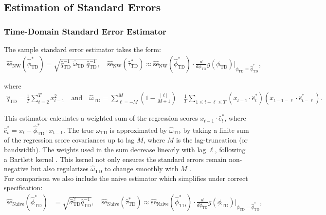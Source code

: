 \documentclass[9pt]{article}
\newcommand{\phitd}{\phi_{\scriptscriptstyle\text{TD}}}
\newcommand{\hatphitd}{\hat{\phi}^*_{\scriptscriptstyle\text{TD}}}
\newcommand{\hattautd}{\hat{\tau}^*_{\scriptscriptstyle\text{TD}}}
\newcommand{\hatqtd}{\hat{q}_{\scriptscriptstyle\text{TD}}}
\newcommand{\omegatd}{\omega_{\scriptscriptstyle\text{TD}}}
\newcommand{\hatomegatd}{\hat{\omega}_{\scriptscriptstyle\text{TD}}}
\newcommand{\hatsigmatd}{\hat{\sigma}_{\scriptscriptstyle\text{TD}}}
\begin{document}
\subsection{Estimation of Standard Errors}\label{sec:stderr_}
\subsubsection{Time-Domain Standard Error Estimator}\label{sec:stderr-time-domain_}
The sample standard error estimator takes the form:
\begin{align}\label{eq:stderr-time-domain_}
\widehat{\text{se}}_{\text{NW}}(\hatphitd) = \sqrt{\hatqtd^{-1}\;\hatomegatd\; \hatqtd^{-1}}, \quad
\widehat{\text{se}}_{\text{NW}}(\hattautd) \approx \widehat{\text{se}}_{\text{NW}}(\hatphitd) \cdot \frac{d}{d\phitd} g(\phitd)\Big|_{\phitd=\hatphitd},
\end{align}

\noindent where
\begin{align}\label{eq:lls_q_omega_}
    \hatqtd = \frac{1}{T} \sum_{t=2}^T x_{t-1}^2 \quad\text{and}\quad
    \hatomegatd = \sum_{\ell=-M}^M \left(1 - \frac{|\ell|}{M+1}\right) \quad \frac{1}{T} \sum_{1\le t - \ell \le T} (x_{t-1} \cdot \hat e_t^*)(x_{t-1-\ell} \cdot \hat e_{t-\ell}^*).
\end{align}

\noindent This estimator calculates a weighted sum of the regression scores $x_{t-1} \cdot \hat e_t^*$, where $\hat e_t^* = x_t - \hatphitd \cdot x_{t-1}$. The true $\omegatd$ is approximated by $\hatomegatd$ by taking a finite sum of the regression score covariances up to lag $M$, where $M$ is the lag-truncation (or bandwidth). The weights used in the sum decrease linearly with lag $\ell$, following a Bartlett kernel \citep{newey_simple_1987}. This kernel not only ensures the standard errors remain non-negative but also regularizes $\hatomegatd$ to change smoothly with $M$ \citep[Chapter~14.35]{hansen_econometrics_2022}.\\

\noindent For comparison we also include the naive estimator which simplifies under correct specification:
\begin{align}\label{eq:se-naive_}
    \widehat{\text{se}}_\text{Naive}(\hatphitd) &= \sqrt{\hatsigmatd^2 \hatqtd^{-1}},\quad
    \widehat{\text{se}}_\text{Naive}(\hattautd) \approx \widehat{\text{se}}_{\text{Naive}}(\hatphitd) \cdot \frac{d}{d\phitd} g(\phitd)\big|_{\phitd=\hatphitd},
\end{align}
\end{document}
